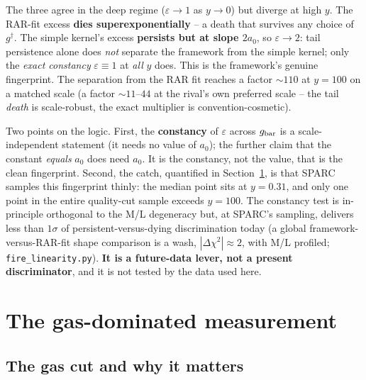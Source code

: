 \documentclass[fleqn,usenatbib]{mnras}
\begin{document}
The three agree in the deep regime ($\varepsilon\to1$ as $y\to0$) but diverge at high $y$. The \citet{McGaugh2016} RAR-fit excess \textbf{dies superexponentially} -- a death that survives any choice of $g^\dagger$. The simple kernel's excess \textbf{persists but at slope $2a_0$}, so $\varepsilon\to2$: tail persistence alone does \emph{not} separate the framework from the simple kernel; only the \emph{exact constancy} $\varepsilon\equiv1$ at \emph{all} $y$ does. This is the framework's genuine fingerprint. The separation from the RAR fit reaches a factor ${\sim}110$ at $y=100$ on a matched scale (a factor ${\sim}11$--$44$ at the rival's own preferred scale -- the tail \emph{death} is scale-robust, the exact multiplier is convention-cosmetic).

Two points on the logic. First, the \textbf{constancy} of $\varepsilon$ across $g_{\rm bar}$ is a scale-independent statement (it needs no value of $a_0$); the further claim that the constant \emph{equals} $a_0$ does need $a_0$. It is the constancy, not the value, that is the clean fingerprint. Second, the catch, quantified in Section~\ref{sec:measurement}, is that SPARC samples this fingerprint thinly: the median point sits at $y=0.31$, and only one point in the entire quality-cut sample exceeds $y=100$. The constancy test is in-principle orthogonal to the M/L degeneracy but, at SPARC's sampling, delivers less than $1\sigma$ of persistent-versus-dying discrimination today (a global framework-versus-RAR-fit shape comparison is a wash, $|\Delta\chi^2|\approx2$, with M/L profiled; \texttt{fire\_linearity.py}). \textbf{It is a future-data lever, not a present discriminator}, and it is not tested by the data used here.


\section{The gas-dominated measurement}
\label{sec:measurement}

\subsection{The gas cut and why it matters}
\label{sec:gascut}
\end{document}

